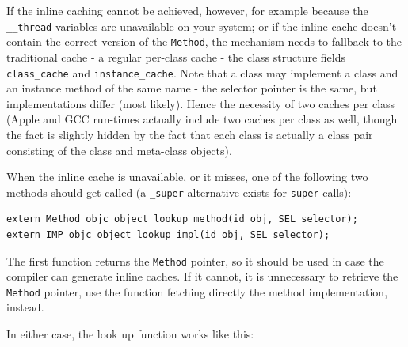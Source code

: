 If the inline caching cannot be achieved, however, for example because the \verb=__thread= variables are unavailable on your system; or if the inline cache doesn't contain the correct version of the \verb=Method=, the mechanism needs to fallback to the traditional cache - a regular per-class cache - the class structure fields \verb=class_cache= and \verb=instance_cache=. Note that a class may implement a class and an instance method of the same name - the selector pointer is the same, but implementations differ (most likely). Hence the necessity of two caches per class (Apple and GCC run-times actually include two caches per class as well, though the fact is slightly hidden by the fact that each class is actually a class pair consisting of the class and meta-class objects).

When the inline cache is unavailable, or it misses, one of the following two methods should get called (a \verb=_super= alternative exists for \verb=super= calls):

\begin{verbatim}
extern Method objc_object_lookup_method(id obj, SEL selector);
extern IMP objc_object_lookup_impl(id obj, SEL selector);
\end{verbatim}

The first function returns the \verb=Method= pointer, so it should be used in case the compiler can generate inline caches. If it cannot, it is unnecessary to retrieve the \verb=Method= pointer, use the function fetching directly the method implementation, instead.

In either case, the look up function works like this:

